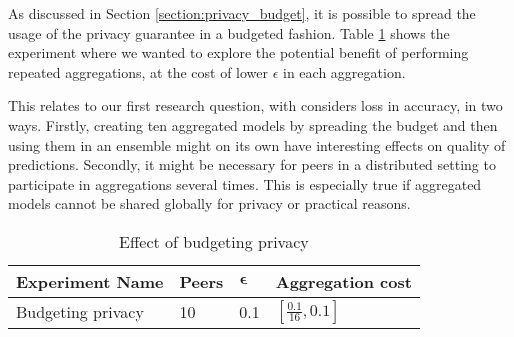 As discussed in Section \ref{section:privacy_budget}, it is possible to spread the usage of the privacy guarantee in a budgeted fashion. Table \ref{tab:experiments_budgeting_privacy} shows the experiment where we wanted to explore the potential benefit of performing repeated aggregations, at the cost of lower $\epsilon$ in each aggregation. 

This relates to our first research question, with considers loss in accuracy, in two ways. Firstly, creating ten aggregated models by spreading the budget and then using them in an ensemble might on its own have interesting effects on quality of predictions. Secondly, it might be necessary for peers in a distributed setting to participate in aggregations several times. This is especially true if aggregated models cannot be shared globally for privacy or practical reasons.

\begin{table}[h]
	\centering	
	\begin{tabular}{|l|l|l|l|}
		{\bf Experiment Name} & {\bf Peers} & $\boldsymbol{\epsilon}$ & {\bf Aggregation cost}        \\
		\hline
		Budgeting privacy & 10    & 0.1     & $[\frac{0.1}{16}, 0.1]$
	\end{tabular}
	\caption{Effect of budgeting privacy}
	\label{tab:experiments_budgeting_privacy}
\end{table}
